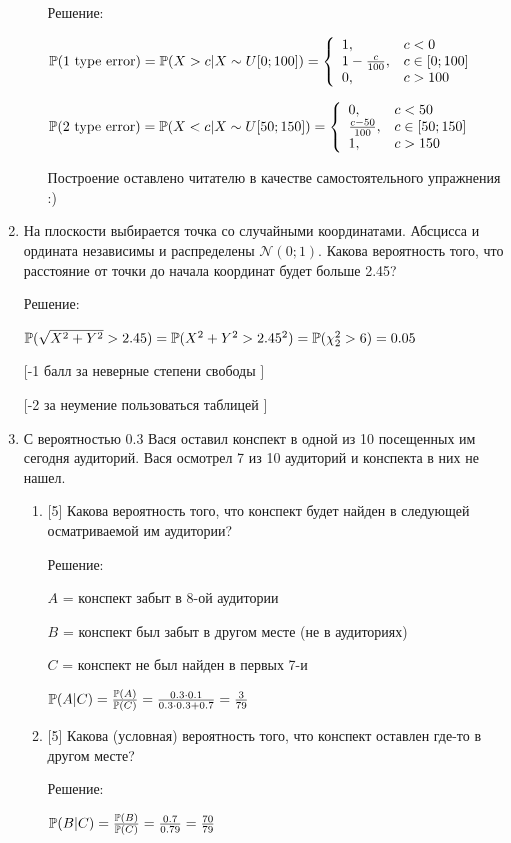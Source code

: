 \documentclass[12pt, a4paper]{article}\usepackage[]{graphicx}\usepackage[]{color}
\begin{document}
\begin{enumerate}
\begin{enumerate}
Решение:

$\P(\text{1 type error})=\P(X>c|X\sim U[0;100])= \left\{
\begin{array}{ll}
  1, & c<0 \\
  1-\frac{c}{100}, & c \in [0;100] \\
  0, & c>100 \\
\end{array}
\right.$

$\P(\text{2 type error})=\P(X<c|X\sim U[50;150])= \left\{
\begin{array}{ll}
  0, & c<50 \\
  \frac{c-50}{100}, & c \in [50;150] \\
  1, & c>150 \\
\end{array}
\right.$

Построение оставлено читателю в качестве самостоятельного
упражнения :)
\end{enumerate}

\item На плоскости выбирается точка со случайными координатами. Абсцисса
и ордината независимы и распределены $\mathcal{N}(0;1)$. Какова вероятность
того, что расстояние от точки до начала координат будет больше
2.45?

Решение:

$\P(\sqrt{X^{2}+Y^{2}}>2.45)=\P(X^{2}+Y^{2}>2.45^{2})=\P(\chi_{2}^{2}>6)=0.05$

$[$-1 балл за неверные степени свободы $]$

$[$-2 за неумение пользоваться таблицей $]$

\item С вероятностью 0.3 Вася оставил конспект в одной из 10 посещенных
им сегодня аудиторий. Вася осмотрел 7 из 10 аудиторий и конспекта в них не нашел.
\begin{enumerate}
\item{} [5] Какова вероятность того, что конспект будет найден в
следующей осматриваемой им аудитории?

Решение:

$A$ = конспект забыт в 8-ой аудитории

$B$ = конспект был забыт в другом месте (не в аудиториях)

$C$ = конспект не был найден в первых 7-и

$\P(A|C)=\frac{\P(A)}{\P(C)}=\frac{0.3\cdot 0.1}{0.3\cdot
0.3+0.7}=\frac{3}{79}$
\item{} [5] Какова (условная) вероятность того, что конспект оставлен
где-то в другом месте?

Решение:

$\P(B|C)=\frac{\P(B)}{\P(C)}=\frac{0.7}{0.79}=\frac{70}{79}$
\end{enumerate}
\end{enumerate}
\end{document}
